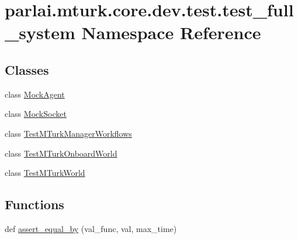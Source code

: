 \hypertarget{namespaceparlai_1_1mturk_1_1core_1_1dev_1_1test_1_1test__full__system}{}\section{parlai.\+mturk.\+core.\+dev.\+test.\+test\+\_\+full\+\_\+system Namespace Reference}
\label{namespaceparlai_1_1mturk_1_1core_1_1dev_1_1test_1_1test__full__system}
\subsection*{Classes}
\begin{DoxyCompactItemize}
\item 
class \hyperlink{classparlai_1_1mturk_1_1core_1_1dev_1_1test_1_1test__full__system_1_1MockAgent}{Mock\+Agent}
\item 
class \hyperlink{classparlai_1_1mturk_1_1core_1_1dev_1_1test_1_1test__full__system_1_1MockSocket}{Mock\+Socket}
\item 
class \hyperlink{classparlai_1_1mturk_1_1core_1_1dev_1_1test_1_1test__full__system_1_1TestMTurkManagerWorkflows}{Test\+M\+Turk\+Manager\+Workflows}
\item 
class \hyperlink{classparlai_1_1mturk_1_1core_1_1dev_1_1test_1_1test__full__system_1_1TestMTurkOnboardWorld}{Test\+M\+Turk\+Onboard\+World}
\item 
class \hyperlink{classparlai_1_1mturk_1_1core_1_1dev_1_1test_1_1test__full__system_1_1TestMTurkWorld}{Test\+M\+Turk\+World}
\end{DoxyCompactItemize}
\subsection*{Functions}
\begin{DoxyCompactItemize}
\item 
def \hyperlink{namespaceparlai_1_1mturk_1_1core_1_1dev_1_1test_1_1test__full__system_a08d3f9d5e50fd752ba609ce51013e4ce}{assert\+\_\+equal\+\_\+by} (val\+\_\+func, val, max\+\_\+time)
\end{DoxyCompactItemize}
